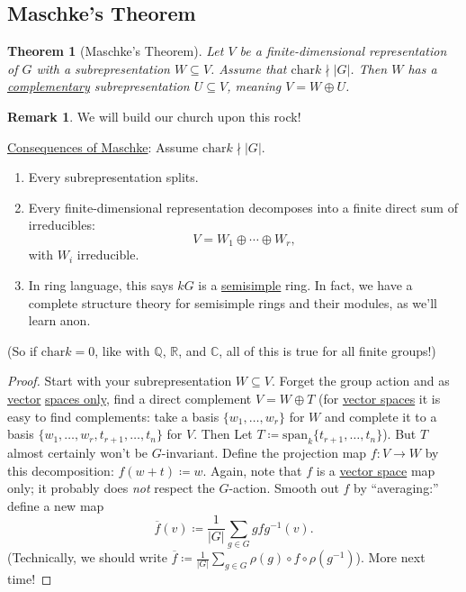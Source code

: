 \documentclass[12pt]{article}
\newcommand{\q}{\mathbb{Q}}
\newcommand{\cx}{\mathbb{C}}
\newcommand{\real}{\mathbb{R}}
\newcommand{\ita}[1]{\textit{#1}}
\newcommand\inv[1]{#1^{-1}}
\newtheorem{theorem}{Theorem}[section]
\theoremstyle{definition}
\newtheorem*{remark}{Remark}
\begin{document}
\subsection{Maschke's Theorem}
\begin{theorem}[Maschke's Theorem]
    Let $V$ be a finite-dimensional representation of $G$ with a subrepresentation $W\subseteq V$. Assume that $\mathrm{char}k\nmid|G|$. Then $W$ has a \underline{complementary} subrepresentation $U\subseteq V$, meaning $V=W\oplus U$.
\end{theorem}
\begin{remark}
    We will build our church upon this rock!
\end{remark}
\noindent\underline{Consequences of Maschke}: Assume $\mathrm{char}k\nmid|G|$.
\begin{enumerate}
    \item Every subrepresentation splits.
    \item Every finite-dimensional representation decomposes into a finite direct sum of irreducibles:
    \begin{equation}
        V=W_1\oplus\dotsb\oplus W_r,
    \end{equation}
    with $W_i$ irreducible.
    \item In ring language, this says $kG$ is a \underline{semisimple} ring. In fact, we have a complete structure theory for semisimple rings and their modules, as we'll learn anon.
\end{enumerate}
(So if $\mathrm{char}k=0$, like with $\q$, $\real$, and $\cx$, all of this is true for all finite groups!)
\begin{proof}
    Start with your subrepresentation $W\subseteq V$. Forget the group action and as \underline{vector} \underline{spaces only}, find a direct complement $V=W\oplus T$ (for \underline{vector spaces} it is easy to find complements: take a basis $\{w_1,\dotsc,w_r\}$ for $W$ and complete it to a basis $\{w_1,\dotsc,w_r,t_{r+1},\dotsc,t_n\}$ for $V$. Then Let $T\coloneqq \mathrm{span}_k\{t_{r+1},\dotsc,t_n\}$). But $T$ almost certainly won't be $G$-invariant. Define the projection map $f:V\to W$ by this decomposition: $f(w+t)\coloneqq w$. Again, note that $f$ is a \underline{vector space} map only; it probably does \ita{not} respect the $G$-action. Smooth out $f$ by ``averaging:'' define a new map 
    \begin{equation}
        \overline{f}(v)\coloneqq \frac{1}{|G|}\sum\limits_{g\in G}gf\inv{g}(v).
    \end{equation}
    (Technically, we should write $\overline{f}\coloneqq \frac{1}{|G|}\sum\limits_{g\in G}\rho(g)\circ f\circ\rho(\inv{g})$). More next time!
\end{proof}
\end{document}

